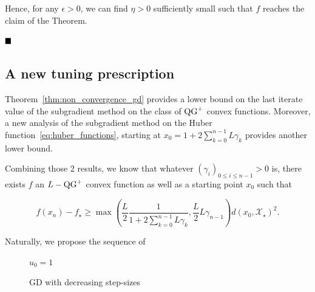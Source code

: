             Hence, for any $\epsilon >0$, we can find $\eta >0$ sufficiently small such that $f$ reaches the claim of the Theorem.
            
        $\hfill\blacksquare$

    \subsection{A new tuning prescription}
    \label{apx:gd_conjecture}

        Theorem~\ref{thm:non_convergence_gd} provides a lower bound on the last iterate value of the subgradient method on the class of $\operatorname{QG}^+$ convex functions.
        Moreover, a new analysis of the subgradient method on the Huber function~\eqref{eq:huber_functions}, starting at $x_0 = 1 + 2 \sum_{k=0}^{n-1} L\gamma_k$ provides another lower bound.
        
        Combining those 2 results, we know that whatever $(\gamma_i)_{0 \leq i \leq n-1}>0$ is, there exists $f$ an $L-\operatorname{QG}^+$ convex function as well as a starting point $x_0$ such that
        
        \begin{equation}
            \label{eq:gd_lower_bound}
            f(x_n) - f_\star \geq \max\left(\frac{L}{2}\frac{1}{1 + 2 \sum_{k=0}^{n-1} L\gamma_k}, \frac{L}{2}L\gamma_{n-1}\right) d(x_0, \mathcal{X}_\star)^2.
        \end{equation}

        Naturally, we propose the sequence of
        
        \begin{figure}
            \vspace{-1cm}
            \begin{minipage}{0.45\textwidth}
                \begin{algorithm}[H]
                    \caption{GD with decreasing step-sizes}\label{alg:gd_decreasing_step_sizes}
                    $u_0 = 1$
                    
                \end{algorithm}
            \end{minipage}
        \end{figure}

